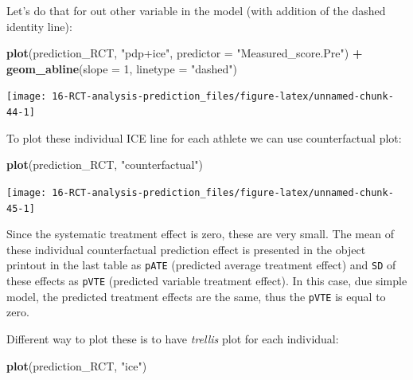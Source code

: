 \documentclass[
]{book}
\newenvironment{Shaded}{\begin{snugshade}}{\end{snugshade}}
\newcommand{\DataTypeTok}[1]{\textcolor[rgb]{0.13,0.29,0.53}{#1}}
\newcommand{\DecValTok}[1]{\textcolor[rgb]{0.00,0.00,0.81}{#1}}
\newcommand{\KeywordTok}[1]{\textcolor[rgb]{0.13,0.29,0.53}{\textbf{#1}}}
\newcommand{\NormalTok}[1]{#1}
\newcommand{\OperatorTok}[1]{\textcolor[rgb]{0.81,0.36,0.00}{\textbf{#1}}}
\newcommand{\StringTok}[1]{\textcolor[rgb]{0.31,0.60,0.02}{#1}}
\begin{document}
Let's do that for out other variable in the model (with addition of the dashed identity line):

\begin{Shaded}
\begin{Highlighting}[]
\KeywordTok{plot}\NormalTok{(prediction\_RCT, }\StringTok{"pdp+ice"}\NormalTok{, }\DataTypeTok{predictor =} \StringTok{"Measured\_score.Pre"}\NormalTok{) }\OperatorTok{+}
\StringTok{  }\KeywordTok{geom\_abline}\NormalTok{(}\DataTypeTok{slope =} \DecValTok{1}\NormalTok{, }\DataTypeTok{linetype =} \StringTok{"dashed"}\NormalTok{)}
\end{Highlighting}
\end{Shaded}

\begin{center}\texttt{[image: 16-RCT-analysis-prediction\_files/figure-latex/unnamed-chunk-44-1]} \end{center}

To plot these individual ICE line for each athlete we can use counterfactual plot:

\begin{Shaded}
\begin{Highlighting}[]
\KeywordTok{plot}\NormalTok{(prediction\_RCT, }\StringTok{"counterfactual"}\NormalTok{)}
\end{Highlighting}
\end{Shaded}

\begin{center}\texttt{[image: 16-RCT-analysis-prediction\_files/figure-latex/unnamed-chunk-45-1]} \end{center}

Since the systematic treatment effect is zero, these are very small. The mean of these individual counterfactual prediction effect is presented in the object printout in the last table as \texttt{pATE} (predicted average treatment effect) and \texttt{SD} of these effects as \texttt{pVTE} (predicted variable treatment effect). In this case, due simple model, the predicted treatment effects are the same, thus the \texttt{pVTE} is equal to zero.

Different way to plot these is to have \emph{trellis} plot for each individual:

\begin{Shaded}
\begin{Highlighting}[]
\KeywordTok{plot}\NormalTok{(prediction\_RCT, }\StringTok{"ice"}\NormalTok{)}
\end{Highlighting}
\end{Shaded}
\end{document}
